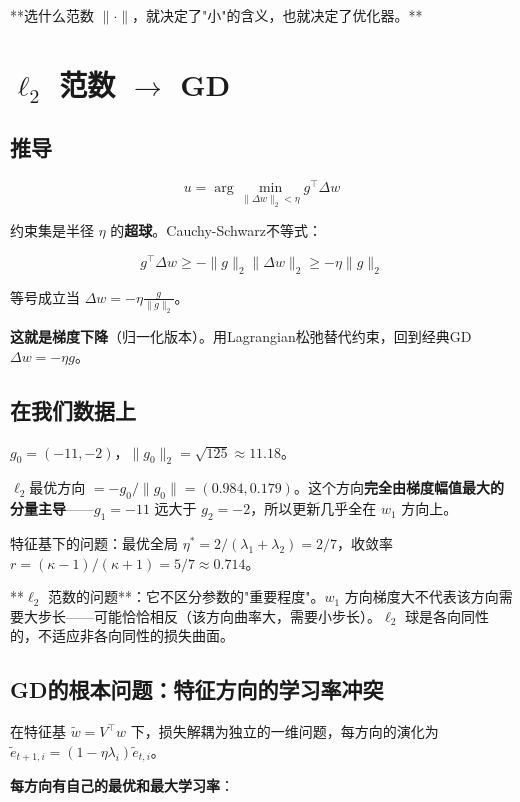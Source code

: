 \documentclass[12pt,a4paper]{article}
\begin{document}
**选什么范数 $\|\cdot\|$，就决定了"小"的含义，也就决定了优化器。**




\section{$\ell_2$ 范数 $\to$ GD}


\subsection{推导}


\[u = \arg\min_{\|\Delta w\|_2 < \eta} g^\top \Delta w\]

约束集是半径 $\eta$ 的\textbf{超球}。Cauchy-Schwarz不等式：


\[g^\top \Delta w \ge -\|g\|_2 \|\Delta w\|_2 \ge -\eta\|g\|_2\]

等号成立当 $\Delta w = -\eta \frac{g}{\|g\|_2}$。

\textbf{这就是梯度下降}（归一化版本）。用Lagrangian松弛替代约束，回到经典GD $\Delta w = -\eta g$。


\subsection{在我们数据上}

$g_0 = (-11, -2)$，$\|g_0\|_2 = \sqrt{125} \approx 11.18$。

$\ell_2$最优方向 $= -g_0/\|g_0\| = (0.984, 0.179)$。这个方向\textbf{完全由梯度幅值最大的分量主导}——$g_1 = -11$ 远大于 $g_2 = -2$，所以更新几乎全在 $w_1$ 方向上。

特征基下的问题：最优全局 $\eta^* = 2/(\lambda_1+\lambda_2) = 2/7$，收敛率 $r = (\kappa-1)/(\kappa+1) = 5/7 \approx 0.714$。

**$\ell_2$ 范数的问题**：它不区分参数的"重要程度"。$w_1$ 方向梯度大不代表该方向需要大步长——可能恰恰相反（该方向曲率大，需要小步长）。$\ell_2$ 球是各向同性的，不适应非各向同性的损失曲面。



\subsection{GD的根本问题：特征方向的学习率冲突}

在特征基 $\tilde{w} = V^\top w$ 下，损失解耦为独立的一维问题，每方向的演化为 $\tilde{e}_{t+1,i} = (1 - \eta\lambda_i)\tilde{e}_{t,i}$。

\textbf{每方向有自己的最优和最大学习率}：
\end{document}

